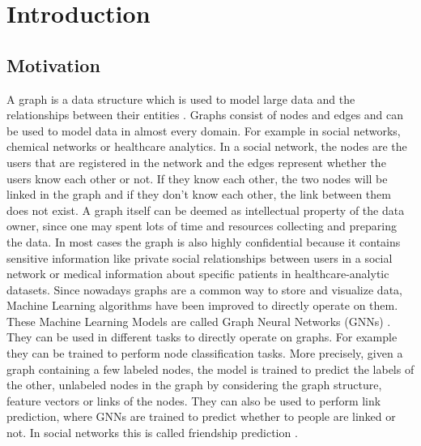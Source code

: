 \chapter{Introduction}


	\section{Motivation}

		A graph is a data structure which is used to model large data and the relationships between their entities \cite{DBLP:journals/corr/abs-2005-00687, cook2006mining}.
		Graphs consist of nodes and edges and can be used to model data in almost every domain.
		For example in social networks, chemical networks or healthcare analytics.
		In a social network, the nodes are the users that are registered in the network and the edges represent whether the users know each other or not.
		If they know each other, the two nodes will be linked in the graph and if they don't know each other, the link between them does not exist.
		A graph itself can be deemed as intellectual property of the data owner, since one may spent lots of time and resources collecting and preparing the data.
		In most cases the graph is also highly confidential because it contains sensitive information like private social relationships between users in a social network or medical information about specific patients in healthcare-analytic datasets.
		Since nowadays graphs are a common way to store and visualize data, Machine Learning algorithms have been improved to directly operate on them.
		These Machine Learning Models are called Graph Neural Networks (GNNs) \cite{atwood2016diffusionconvolutional, defferrard2017convolutional}.
		They can be used in different tasks to directly operate on graphs.
		For example they can be trained to perform node classification tasks\cite{kipf2017semisupervised}.
		More precisely, given a graph containing a few labeled nodes, the model is trained to predict the labels of the other, unlabeled nodes in the graph by considering the graph structure, feature vectors or links of the nodes.
		They can also be used to perform link prediction, where GNNs are trained to predict whether to people are linked or not.
		In social networks this is called friendship prediction \cite{zhang2018link}.

